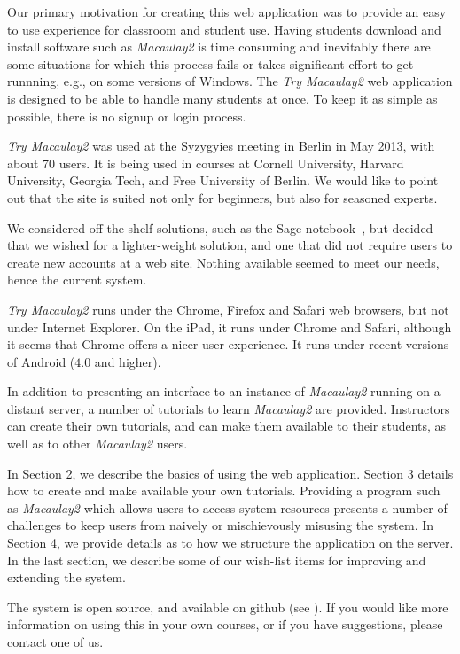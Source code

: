 \documentclass[twocolumn]{article}
\def\tryM2{{\it Try Macaulay2}}
\def\M2{{\it Macaulay2}}
\begin{document}
Our primary motivation for creating this web application was to
provide an easy to use experience for classroom and student use.
Having students download and install software such as \M2 is time
consuming and inevitably there are some situations for which this
process fails or takes significant effort to get runnning, e.g., on
some versions of Windows.  The \tryM2 web application is designed to
be able to handle many students at once. To keep it as simple as possible,
there is no signup or login process.


 \tryM2 was used at the Syzygyies
meeting in Berlin in May 2013, with about 70 users. It is being used in courses at Cornell University, Harvard University, Georgia Tech, and Free University of Berlin. We would like to point out that the
site is suited not only for beginners, but also for seasoned experts.

We considered off the shelf solutions, such as the Sage
notebook~\cite{sagenotebook}, but decided that we wished for a
lighter-weight solution, and one that did not require users to create
new accounts at a web site.  Nothing available seemed to meet our
needs, hence the current system.

\tryM2 runs under the Chrome, Firefox and Safari web browsers, but not
under Internet Explorer.  On the iPad, it runs under Chrome and
Safari, although it seems that Chrome offers a nicer user experience.
It runs under recent versions of Android ($4.0$ and higher).

In addition to presenting an interface to an instance of \M2
running on a distant server, a number of tutorials to
learn \M2 are provided.  Instructors can create their own
tutorials, and can make them available to their students, as well as
to other \M2 users.  

In Section 2, we describe the basics of using the web application.
Section 3 details how to create and make available your own tutorials.
Providing a program such as \M2 which allows users to
access system resources presents a number of challenges to keep users
from naively or mischievously misusing the system.  In Section 4, we
provide details as to how we structure the application on the server.
In the last section, we describe some of our wish-list items for
improving and extending the system.

The system is open source, and available on github (see \cite{github}).
If you would like more information on using this in your own courses,
or if you have suggestions, please contact one of us.
\end{document}
